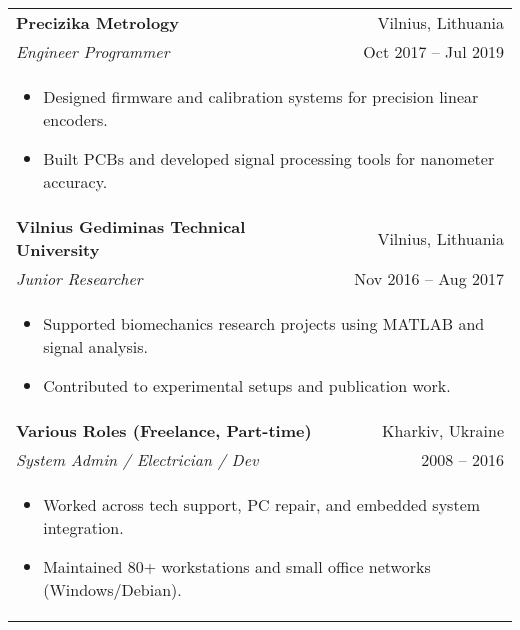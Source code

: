 \begin{tabularx}{\textwidth}{Xr}
\textbf{Precizika Metrology} & Vilnius, Lithuania \\
\textit{Engineer Programmer} & Oct 2017 -- Jul 2019 \\
\multicolumn{2}{l}{\begin{itemize}[leftmargin=*]
  \item Designed firmware and calibration systems for precision linear encoders.
  \item Built PCBs and developed signal processing tools for nanometer accuracy.
\end{itemize}} \\
\addlinespace

\textbf{Vilnius Gediminas Technical University} & Vilnius, Lithuania \\
\textit{Junior Researcher} & Nov 2016 -- Aug 2017 \\
\multicolumn{2}{l}{\begin{itemize}[leftmargin=*]
  \item Supported biomechanics research projects using MATLAB and signal analysis.
  \item Contributed to experimental setups and publication work.
\end{itemize}} \\
\addlinespace

\textbf{Various Roles (Freelance, Part-time)} & Kharkiv, Ukraine \\
\textit{System Admin / Electrician / Dev} & 2008 -- 2016 \\
\multicolumn{2}{l}{\begin{itemize}[leftmargin=*]
  \item Worked across tech support, PC repair, and embedded system integration.
  \item Maintained 80+ workstations and small office networks (Windows/Debian).
\end{itemize}}
\end{tabularx}
